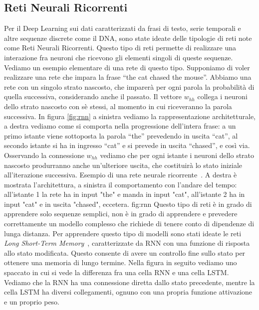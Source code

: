 \subsection{Reti Neurali Ricorrenti}
Per il Deep Learning sui dati caratterizzati da frasi di testo, serie temporali e altre sequenze discrete come il DNA, sono state ideate delle tipologie di reti note come Reti Neurali Ricorrenti. Questo tipo di reti permette di realizzare una interazione fra neuroni che ricevono gli elementi singoli di queste sequenze.
Vediamo un esempio elementare di una rete di questo tipo. Supponiamo di voler realizzare una rete che impara la frase “the cat chased the mouse”. Abbiamo una rete con un singolo strato nascosto, che imparerà per ogni parola la probabilità di quella successiva, considerando anche il passato. Il vettore $ w_{hh} $ collega i neuroni dello strato nascosto con sè stessi, al momento in cui riceveranno la parola successiva.
In figura \ref{fig:rnn} a sinistra vediamo la rappresentazione architetturale, a destra vediamo come si comporta nella progressione dell’intera frase: a un primo istante viene sottoposta la parola “the” prevedendo in uscita “cat”, al secondo istante si ha in ingresso “cat” e si prevede in uscita “chased”, e così via. Osservando la connessione $ w_{hh} $ vediamo che per ogni istante i neuroni dello strato nascosto produrranno anche un’ulteriore uscita, che costituirà lo stato iniziale all’iterazione successiva.
{Esempio di una rete neurale ricorrente~\cite{aggarwal}. A destra è mostrata l'architettura, a sinistra il comportamento con l'andare del tempo: all'istante 1 la rete ha in input "the" e manda in input "cat", all'istante 2 ha in input "cat" e in uscita "chased", eccetera.}
{fig:rnn}
Questo tipo di reti è in grado di apprendere solo sequenze semplici, non è in grado di apprendere e prevedere correttamente un modello complesso che richiede di tenere conto di dipendenze di lunga distanza. Per apprendere questo tipo di modelli sono stati ideate le reti \textit{Long Short-Term Memory}~\cite{hochreiter}, caratterizzate da RNN con una funzione di risposta allo stato modificata. Questo consente di avere un controllo fine sullo stato per ottenere una memoria di lungo termine.
Nella figura in seguito vediamo uno spaccato in cui si vede la differenza fra una cella RNN e una cella LSTM. Vediamo che la RNN ha una connessione diretta dallo stato precedente, mentre la cella LSTM ha diversi collegamenti, ognuno con una propria funzione attivazione e un proprio peso.
